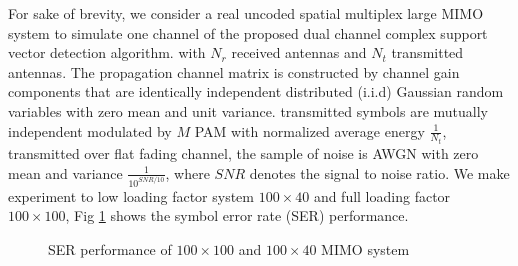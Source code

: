 \documentclass[12pt, draftclsnofoot, onecolumn]{IEEEtran}
\begin{document}
\begin{spacing}{2}
For sake of brevity, we consider a real uncoded spatial multiplex large MIMO system to simulate one channel of the proposed dual channel complex support vector detection algorithm.  with $N_{r}$ received antennas and $N_{t}$ transmitted antennas. The propagation channel matrix is constructed by channel gain components that are identically independent distributed (i.i.d) Gaussian random variables with zero mean and unit variance. transmitted symbols are mutually independent modulated by $M$ PAM with normalized average energy $\frac{1}{N_{t}}$, transmitted over flat fading channel, the sample of noise is AWGN with zero mean and variance $\frac{1}{10^{SNR/10}}$, where $SNR$ denotes the signal to noise ratio. 
We make experiment to low loading factor system $100\times 40$ and full loading factor $100\times 100$, Fig \ref{SER performance} shows the symbol error rate (SER) performance.  
\begin{figure}
\centering
\def\svgwidth{\columnwidth}

\caption{SER performance of $100\times 100 $ and $100\times 40$ MIMO system}
\label{SER performance}
\end{figure}
%
%




\end{spacing}
\end{document}
